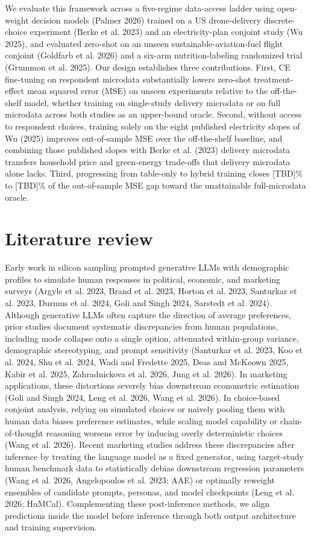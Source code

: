 \documentclass[
  11pt,
  letterpaper,
]{article}
\begin{document}
We evaluate this framework across a five-regime data-access ladder using
open-weight decision models (Palmer 2026) trained on a US drone-delivery
discrete-choice experiment (Berke et al. 2023) and an electricity-plan
conjoint study (Wu 2025), and evaluated zero-shot on an unseen
sustainable-aviation-fuel flight conjoint (Goldfarb et al. 2026) and a
six-arm nutrition-labeling randomized trial (Grummon et al. 2025). Our
design establishes three contributions. First, CE fine-tuning on
respondent microdata substantially lowers zero-shot treatment-effect
mean squared error (MSE) on unseen experiments relative to the
off-the-shelf model, whether training on single-study delivery microdata
or on full microdata across both studies as an upper-bound oracle.
Second, without access to respondent choices, training solely on the
eight published electricity slopes of Wu (2025) improves out-of-sample
MSE over the off-the-shelf baseline, and combining those published
slopes with Berke et al. (2023) delivery microdata transfers household
price and green-energy trade-offs that delivery microdata alone lacks.
Third, progressing from table-only to hybrid training closes {[}TBD{]}\%
to {[}TBD{]}\% of the out-of-sample MSE gap toward the unattainable
full-microdata oracle.

\section{Literature review}\label{sec-lit}

Early work in silicon sampling prompted generative LLMs with demographic
profiles to simulate human responses in political, economic, and
marketing surveys (Argyle et al. 2023, Brand et al. 2023, Horton et al.
2023, Santurkar et al. 2023, Durmus et al. 2024, Goli and Singh 2024,
Sarstedt et al. 2024). Although generative LLMs often capture the
direction of average preferences, prior studies document systematic
discrepancies from human populations, including mode collapse onto a
single option, attenuated within-group variance, demographic
stereotyping, and prompt sensitivity (Santurkar et al. 2023, Koo et al.
2024, Shu et al. 2024, Wadi and Fredette 2025, Deas and McKeown 2025,
Kabir et al. 2025, Zahradnickova et al. 2026, Jung et al. 2026). In
marketing applications, these distortions severely bias downstream
econometric estimation (Goli and Singh 2024, Leng et al. 2026, Wang et
al. 2026). In choice-based conjoint analysis, relying on simulated
choices or naively pooling them with human data biases preference
estimates, while scaling model capability or chain-of-thought reasoning
worsens error by inducing overly deterministic choices (Wang et al.
2026). Recent marketing studies address these discrepancies after
inference by treating the language model as a fixed generator, using
target-study human benchmark data to statistically debias downstream
regression parameters (Wang et al. 2026, Angelopoulos et al. 2023; AAE)
or optimally reweight ensembles of candidate prompts, personas, and
model checkpoints (Leng et al. 2026; HuMCal). Complementing these
post-inference methods, we align predictions inside the model before
inference through both output architecture and training supervision.
\end{document}
